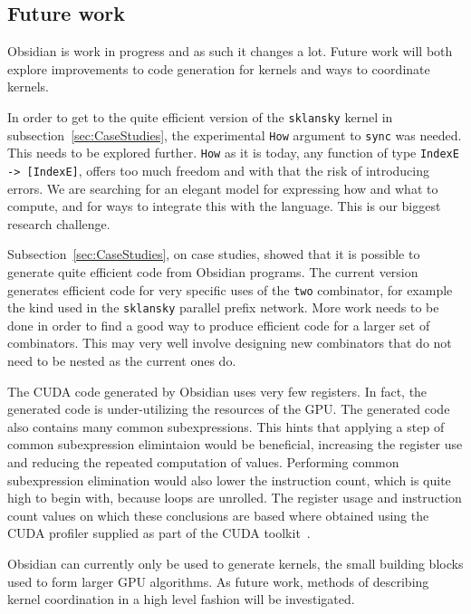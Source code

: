 \FloatBarrier
\subsection{Future work}

Obsidian is work in progress and as such it changes a lot. Future work will both
explore improvements to code generation for kernels and ways to coordinate kernels.

In order to get to the quite efficient version of the {\tt sklansky} kernel 
in subsection~\ref{sec:CaseStudies}, the experimental {\tt How} argument to {\tt sync} was needed. 
This needs to be 
explored further. {\tt How} as it is today, any function of type
{\tt IndexE -> [IndexE]}, offers too much freedom and with that the risk of
introducing errors. We are searching for an elegant model for expressing how and what 
to compute, and for ways to integrate this with
the language. This is our biggest research challenge.

Subsection~\ref{sec:CaseStudies}, on case studies, showed that it is possible to
generate quite efficient code from Obsidian programs. The current version 
generates efficient code for very specific uses of the {\tt two} combinator, 
for example the kind used in the {\tt sklansky} parallel prefix network. More 
work needs to be done in order to find a good way to produce efficient code 
for a larger set of combinators. 
This may very well involve designing new combinators that do not need
to be nested as the current ones do.

The CUDA code generated by Obsidian uses very few registers. In fact,
the generated code is under-utilizing the resources of the GPU. The generated 
code also contains many common subexpressions. This hints that applying a 
step of common subexpression elimintaion would be beneficial, increasing 
the register use and reducing the repeated computation of values. Performing
common subexpression elimination would also lower the instruction count,
which is quite high to begin with, because loops are unrolled. 
The register usage and instruction count values on which these conclusions 
are based where obtained using the CUDA profiler supplied as part of the 
CUDA toolkit~\cite{wwwcuda}.

Obsidian can currently only be used to generate kernels, the small 
building blocks used to form larger GPU algorithms. As future work, 
methods of describing kernel coordination in a high level fashion will 
be investigated.

